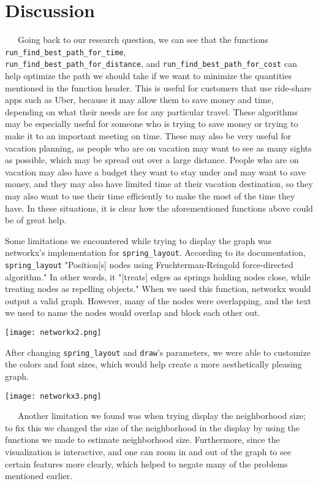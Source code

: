 \documentclass[fontsize=11pt]{article}
\begin{document}
\section*{Discussion}

\ \ \ Going back to our research question, we can see that the functions \texttt{run\_find\_best\_path\_for\_time},  \\
\texttt{run\_find\_best\_path\_for\_distance}, and \texttt{run\_find\_best\_path\_for\_cost} can help optimize the path we should take if we want to minimize the quantities mentioned in the function header. This is useful for customers that use ride-share apps such as Uber, because it may allow them to save money and time, depending on what their needs are for any particular travel. These algorithms may be especially useful for someone who is trying to save money or trying to make it to an important meeting on time. These may also be very useful for vacation planning, as people who are on vacation may want to see as many sights as possible, which may be spread out over a large distance. People who are on vacation may also have a budget they want to stay under and may want to save money, and they may also have limited time at their vacation destination, so they may also want to use their time efficiently to make the most of the time they have. In these situations, it is clear how the aforementioned functions above could be of great help.\newline

Some limitations we encountered while trying to display the graph was networkx's implementation for \texttt{spring\_layout}. According to its documentation, \texttt{spring\_layout} "Position[s] nodes using Fruchterman-Reingold force-directed algorithm." In other words, it "[treats] edges as springs holding nodes close, while treating nodes as repelling objects." When we used this function, networkx would output a valid graph. However, many of the nodes were overlapping, and the text we used to name the nodes would overlap and block each other out. \newline

\begin{center}
\texttt{[image: networkx2.png]}
\end{center}

After changing \texttt{spring\_layout} and \texttt{draw}'s parameters, we were able to customize the colors and font sizes, which would help create a more aesthetically pleasing graph.

\begin{center}
\texttt{[image: networkx3.png]}
\end{center}
\ \ \ Another limitation we found was when trying display the neighborhood size; to fix this we changed the size of the neighborhood in the display by using the functions we made to estimate neighborhood size. Furthermore, since the visualization is interactive, and one can zoom in and out of the graph to see certain features more clearly, which helped to negate many of the problems mentioned earlier.
\end{document}
